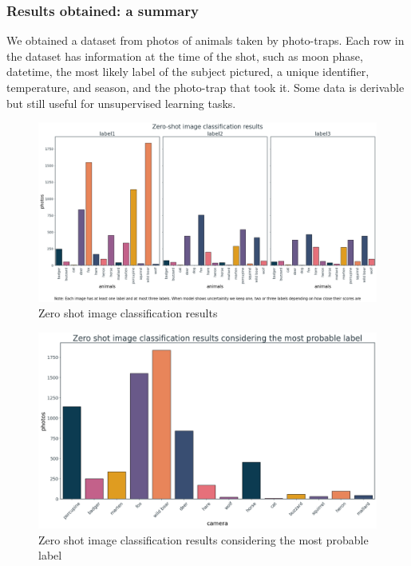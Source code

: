 \documentclass[12pt,a4paper,twoside]{article}
\begin{document}
\subsubsection{Results obtained: a summary}
We obtained a dataset from photos of animals taken by photo-traps. Each row in the dataset has information at the time of the shot, such as moon phase, datetime, the most likely label of the subject pictured, a unique identifier, temperature, and season, and the photo-trap that took it. Some data is derivable but still useful for unsupervised learning tasks.

\begin{figure}[!ht]
    \centering
    \includegraphics[width=\textwidth,height=\textheight,keepaspectratio]{assets/zsic.png}
    \caption{Zero shot image classification results}
    \label{fig:}
\end{figure}

\begin{figure}[!ht]
    \centering
    \includegraphics[width=\textwidth,height=\textheight,keepaspectratio]{assets/animals-count.png}
    \caption{Zero shot image classification results considering the most probable label}
    \label{fig:}
\end{figure}
\end{document}
